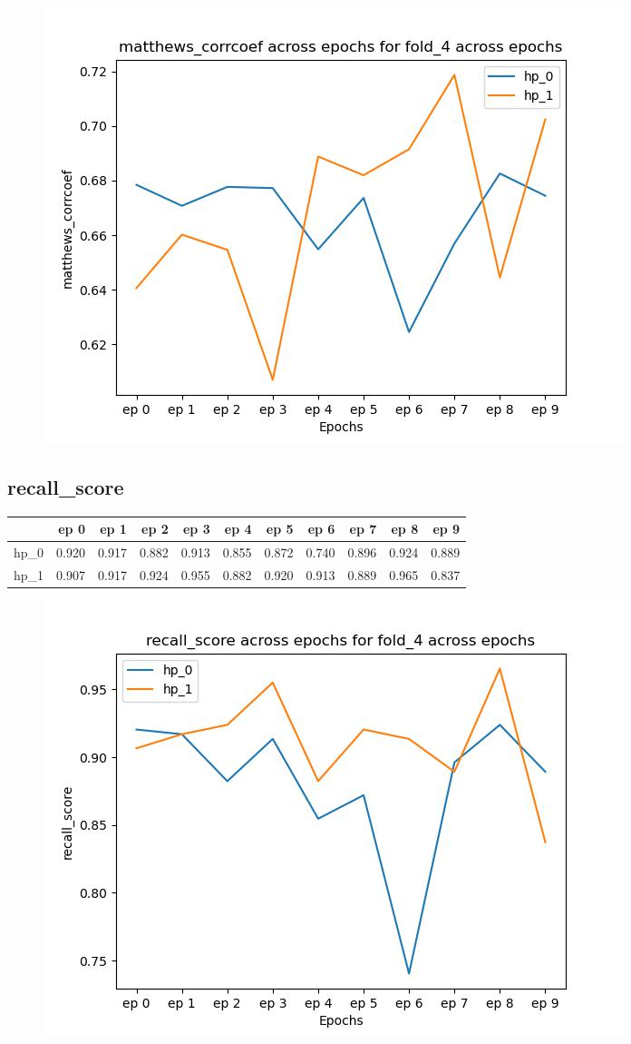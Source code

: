\documentclass{article}
\begin{document}
\begin{figure}[H]
\includegraphics[scale = 0.75]{fold_4/matthews_corrcoef}
\end{figure}
\subsection{recall\_score}
\begin{tabular}{lrrrrrrrrrr}
\toprule
{} &   ep 0 &   ep 1 &   ep 2 &   ep 3 &   ep 4 &   ep 5 &   ep 6 &   ep 7 &   ep 8 &   ep 9 \\
\midrule
hp\_0 &  0.920 &  0.917 &  0.882 &  0.913 &  0.855 &  0.872 &  0.740 &  0.896 &  0.924 &  0.889 \\
hp\_1 &  0.907 &  0.917 &  0.924 &  0.955 &  0.882 &  0.920 &  0.913 &  0.889 &  0.965 &  0.837 \\
\bottomrule
\end{tabular}

\begin{figure}[H]
\includegraphics[scale = 0.75]{fold_4/recall_score}
\end{figure}
\end{document}
